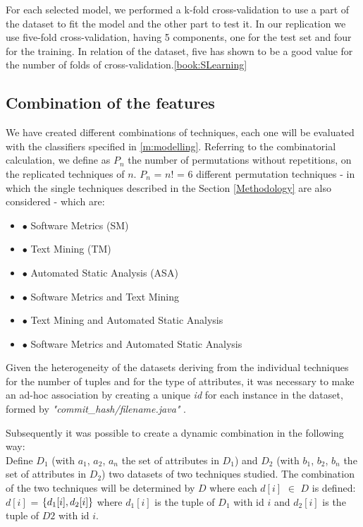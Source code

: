 \documentclass[twocolumn,10pt]{asme2ej}
\begin{document}
For each selected model, we performed a k-fold cross-validation to use a part of the dataset  to fit the model and the other part to test it. In our replication we use five-fold cross-validation, having 5 components, one for the test set and four for the training.
In relation of the dataset, five has shown to be a good value for the number of folds of cross-validation.\ref{book:SLearning}





\subsection{Combination of the features}
We have created different combinations of techniques, each one will be evaluated with the classifiers specified in \ref{m:modelling}. Referring to the combinatorial calculation, we define as $ P_n $ the number of permutations without repetitions, on the replicated techniques of $ n $. $ P_n $ = $ n! $ = $ 6 $ different permutation techniques - in which the single techniques described in the Section \ref{Methodology} are also considered - which are:
\begin{itemize}
    \item $\bullet$ Software Metrics (SM)
    \item $\bullet$ Text Mining (TM)
    \item $\bullet$ Automated Static Analysis (ASA)
    \item $\bullet$ Software Metrics and Text Mining
    \item $\bullet$ Text Mining and Automated Static Analysis
    \item $\bullet$ Software Metrics and Automated Static Analysis
\end{itemize}

Given the heterogeneity of the datasets deriving from the individual techniques for the number of tuples and for the type of attributes, it was necessary to make an ad-hoc association by creating a unique \textit{id} for each instance in the dataset, formed by \textit{"commit\_hash/filename.java"} .

Subsequently it was possible to create a dynamic combination in the following way:\\
Define $D_1$ (with $a_1$, $a_2$, $a_n$ the set of attributes in $D_1$) and $D_2$ (with $b_1$, $b_2$, $b_n$ the set of attributes in $D_2$) two datasets of two techniques studied.
The combination of the two techniques will be determined by $D$ where each $d[i]$ $\in$ $D$ is defined: \\
$ {d [i]} $ = $ \{d_1 [i], d_2 [i] \} \\ $ where $ d_1 [i] $ is the tuple of $ D_1 $ with id $ i $ and $ d_2 [i ] $ is the tuple of $ D2 $ with id $ i $.
\end{document}
